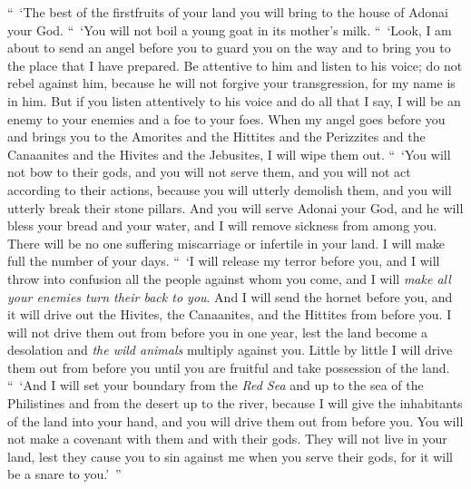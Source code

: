 \begin{biblechapter}
\verse “ ‘The best of the firstfruits of your land you will bring to the house of Adonai your God. “ ‘You will not boil a young goat in its mother’s milk.
 “ ‘Look, I am about to send an angel before you to guard you on the way and to bring you to the place that I have prepared.
\verse Be attentive to him and listen to his voice; do not rebel against him, because he will not forgive your transgression, for my name is in him.
\verse But if you listen attentively to his voice and do all that I say, I will be an enemy to your enemies and a foe to your foes.
\verse When my angel goes before you and brings you to the Amorites and the Hittites and the Perizzites and the Canaanites and the Hivites and the Jebusites, I will wipe them out.
\verse “ ‘You will not bow to their gods, and you will not serve them, and you will not act according to their actions, because you will utterly demolish them, and you will utterly break their stone pillars.
\verse And you will serve Adonai your God, and he will bless your bread and your water, and I will remove sickness from among you.
\verse There will be no one suffering miscarriage or infertile in your land. I will make full the number of your days.
\verse “ ‘I will release my terror before you, and I will throw into confusion all the people against whom you come, and I will \textit{make all your enemies turn their back to you}.
\verse And I will send the hornet before you, and it will drive out the Hivites, the Canaanites, and the Hittites from before you.
\verse I will not drive them out from before you in one year, lest the land become a desolation and \textit{the wild animals} multiply against you.
\verse Little by little I will drive them out from before you until you are fruitful and take possession of the land.
\verse “ ‘And I will set your boundary from the \textit{Red Sea} and up to the sea of the Philistines and from the desert up to the river, because I will give the inhabitants of the land into your hand, and you will drive them out from before you.
\verse You will not make a covenant with them and with their gods.
\verse They will not live in your land, lest they cause you to sin against me when you serve their gods, for it will be a snare to you.’ ”
\end{biblechapter}


